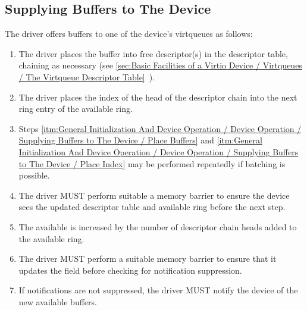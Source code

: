 \subsection{Supplying Buffers to The Device}\label{sec:General Initialization And Device Operation / Device Operation / Supplying Buffers to The Device}

The driver offers buffers to one of the device's virtqueues as follows:

\begin{enumerate}
\item\label{itm:General Initialization And Device Operation / Device Operation / Supplying Buffers to The Device / Place Buffers} The driver places the buffer into free descriptor(s) in the
   descriptor table, chaining as necessary (see \ref{sec:Basic Facilities of a Virtio Device / Virtqueues / The Virtqueue Descriptor Table}~).

\item\label{itm:General Initialization And Device Operation / Device Operation / Supplying Buffers to The Device / Place Index} The driver places the index of the head of the descriptor chain
   into the next ring entry of the available ring.

\item Steps \ref{itm:General Initialization And Device Operation / Device Operation / Supplying Buffers to The Device / Place Buffers} and \ref{itm:General Initialization And Device Operation / Device Operation / Supplying Buffers to The Device / Place Index} may be performed repeatedly if batching
  is possible.

\item The driver MUST perform suitable a memory barrier to ensure the device sees
  the updated descriptor table and available ring before the next
  step.

\item The available  is increased by the number of
  descriptor chain heads added to the available ring.

\item The driver MUST perform a suitable memory barrier to ensure that it updates
  the  field before checking for notification suppression.

\item If notifications are not suppressed, the driver MUST notify the device
    of the new available buffers.
\end{enumerate}

